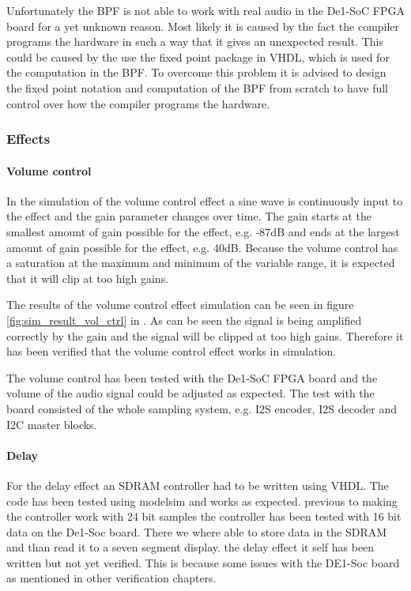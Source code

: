 Unfortunately the BPF is not able to work with real audio in the De1-SoC FPGA board for a yet unknown reason. Most likely it is caused by the fact the compiler programs the hardware in such a way that it gives an unexpected result. This could be caused by the use the fixed point package in VHDL, which is used for the computation in the BPF. To overcome this problem it is advised to design the fixed point notation and computation of the BPF from scratch to have full control over how the compiler programs the hardware. 

\subsubsection{Effects}
\paragraph{Volume control}
In the simulation of the volume control effect a sine wave is continuously input to the effect and the gain parameter changes over time. The gain starts at the smallest amount of gain possible for the effect, e.g. -87dB and ends at the largest amount of gain possible for the effect, e.g. 40dB. Because the volume control has a saturation at the maximum and minimum of the variable range, it is expected that it will clip at too high gains. 

The results of the volume control effect simulation can be seen in figure \ref{fig:sim_result_vol_ctrl} in . As can be seen the signal is being amplified correctly by the gain and the signal will be clipped at too high gains. Therefore it has been verified that the volume control effect works in simulation.

The volume control has been tested with the De1-SoC FPGA board and the volume of the audio signal could be adjusted as expected. The test with the board consisted of the whole sampling system, e.g. I2S encoder, I2S decoder and I2C master blocks. 

\paragraph{Delay}
For the delay effect an SDRAM controller had to be written using VHDL. The code has been tested using modelsim and works as expected. previous to making the controller work with 24 bit samples the controller has been tested with 16 bit data on the De1-Soc board. There we where able to store data in the SDRAM and than read it to a seven segment display. the delay effect it self has been written but not yet verified. This is because some issues with the DE1-Soc board as mentioned in other verification chapters.

